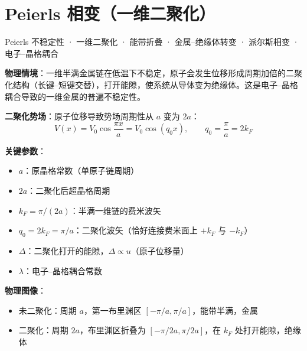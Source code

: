 
\section{Peierls 相变（一维二聚化）}
\label{sec:peierls}

\begin{tipbox}[关键词标签]
Peierls 不稳定性 · 一维二聚化 · 能带折叠 · 金属--绝缘体转变 · 派尔斯相变 · 电子--晶格耦合
\end{tipbox}

\begin{modelbox}
\textbf{物理情境}：一维半满金属链在低温下不稳定，原子会发生位移形成周期加倍的二聚化结构（长键--短键交替），打开能隙，使系统从导体变为绝缘体。这是电子--晶格耦合导致的一维金属的普遍不稳定性。

\textbf{二聚化势场}：原子位移导致势场周期性从 $a$ 变为 $2a$：
\[
V(x)=V_0\cos\frac{\pi x}{a}=V_0\cos(q_0 x),\qquad q_0=\frac{\pi}{a}=2k_F
\]

\textbf{关键参数}：
\begin{itemize}[nosep]
    \item $a$：原晶格常数（单原子链周期）
    \item $2a$：二聚化后超晶格周期
    \item $k_F=\pi/(2a)$：半满一维链的费米波矢
    \item $q_0=2k_F=\pi/a$：二聚化波矢（恰好连接费米面上 $+k_F$ 与 $-k_F$）
    \item $\Delta$：二聚化打开的能隙，$\Delta\propto u$（原子位移量）
    \item $\lambda$：电子--晶格耦合常数
\end{itemize}

\textbf{物理图像}：
\begin{itemize}[nosep]
    \item 未二聚化：周期 $a$，第一布里渊区 $[-\pi/a,\pi/a]$，能带半满，金属
    \item 二聚化：周期 $2a$，布里渊区折叠为 $[-\pi/2a,\pi/2a]$，在 $k_F$ 处打开能隙，绝缘体
\end{itemize}
\end{modelbox}

